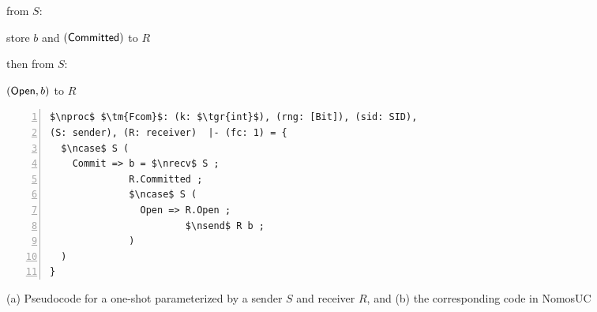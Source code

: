 \begin{figure}
\centering
\begin{minipage}{0.38\textwidth}
\begin{bbox}[title={Functionality $\F_{\m{com}}(S, R)$}]

\OnInput {} from $S$: 

\qquad store $b$ and \Send $(\mathsf{Committed})$ to $R$

then \OnInput {} from $S$: 

\qquad \Send $(\mathsf{Open}, b)$ to $R$
\end{bbox}
\end{minipage}
\hspace{3em}
\begin{minipage}{0.5\textwidth}
\begin{lstlisting}[basicstyle=\scriptsize\BeraMonottFamily, frame=single, mathescape, numbers=left, xleftmargin=2em, xrightmargin=2em]
$\nproc$ $\tm{Fcom}$: (k: $\tgr{int}$), (rng: [Bit]), (sid: SID),
(S: sender), (R: receiver)  |- (fc: 1) = {
  $\ncase$ S (
    Commit => b = $\nrecv$ S ;
              R.Committed ;
              $\ncase$ S (
                Open => R.Open ;
                        $\nsend$ R b ;
              )
  )
}
\end{lstlisting}
\end{minipage}
\caption{(a) Pseudocode for a one-shot \Fcom parameterized by a sender $S$ and receiver $R$,
and (b) the corresponding code in NomosUC}
\label{fig:fcomideal}
\vspace{-4mm}
\end{figure}
